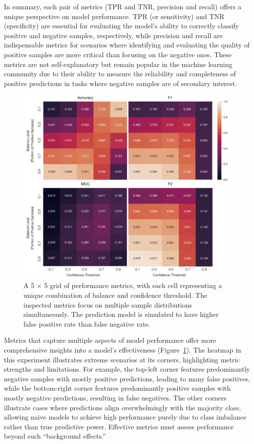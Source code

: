 In summary, each pair of metrics (TPR and TNR, precision and recall) offers a unique perspective on model performance. TPR (or sensitivity) and TNR (specificity) are essential for evaluating the model’s ability to correctly classify positive and negative samples, respectively, while precision and recall are indispensable metrics for scenarios where identifying and evaluating the quality of positive samples are more critical than focusing on the negative ones. These metrics are not self-explanatory but remain popular in the machine learning community due to their ability to measure the reliability and completeness of positive predictions in tasks where negative samples are of secondary interest.


\begin{figure}[H]
    \centering
    \includegraphics[width=.7\textwidth]{fig_11.jpg}
    \caption{A 5 × 5 grid of performance metrics, with each cell representing a unique combination of balance and confidence threshold. The inspected metrics focus on multiple sample distributions simultaneously. The prediction model is simulated to have higher false positive rate than false negative rate.}
    \label{fig:s5_2}
\end{figure}



Metrics that capture multiple aspects of model performance offer more comprehensive insights into a model’s effectiveness (Figure~\ref{fig:s5_2}). The heatmap in this experiment illustrates extreme scenarios at its corners, highlighting metric strengths and limitations. For example, the top-left corner features predominantly negative samples with mostly positive predictions, leading to many false positives, while the bottom-right corner features predominantly positive samples with mostly negative predictions, resulting in false negatives. The other corners illustrate cases where predictions align overwhelmingly with the majority class, allowing naive models to achieve high performance purely due to class imbalance rather than true predictive power. Effective metrics must assess performance beyond such “background effects.”

